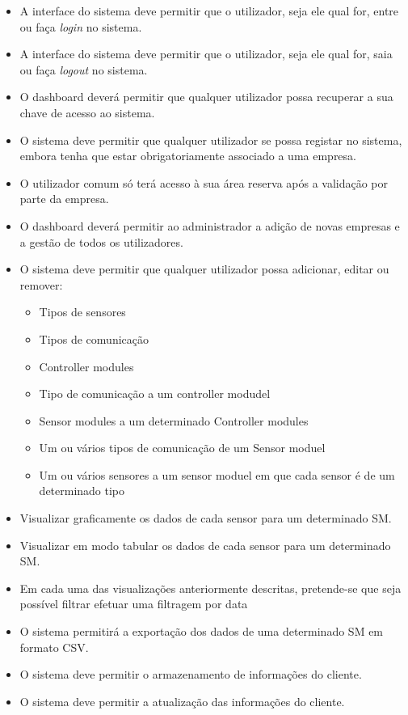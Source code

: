 \begin{itemize}
	\item A interface do sistema deve permitir que o utilizador, seja ele qual for, entre ou faça \textit{login} no sistema. 
	
	\item A interface do sistema deve permitir que o utilizador, seja ele qual for, saia ou faça \textit{logout} no sistema.
	
	\item O dashboard deverá permitir que qualquer utilizador possa recuperar a sua chave de acesso ao sistema.
	
	\item O sistema deve permitir que qualquer utilizador se possa registar no sistema, embora tenha que estar obrigatoriamente associado a uma empresa.
	
	\item O utilizador comum só terá acesso à sua área reserva após a validação por parte da empresa.   
	
	\item O dashboard deverá permitir ao administrador a adição de novas empresas e a gestão de todos os utilizadores. 
	
	\item O sistema deve permitir que qualquer utilizador possa adicionar, editar ou remover: 
	\begin{itemize}
		\item Tipos de sensores 
		\item Tipos de comunicação 
		\item Controller modules
		\item Tipo de comunicação a um controller modudel
		\item Sensor modules a um determinado Controller modules
		\item Um ou vários tipos de comunicação de um Sensor moduel
		\item Um ou vários sensores a um sensor moduel em que cada sensor é de um determinado tipo 
		
	\end{itemize}
	
	\item Visualizar graficamente os dados de cada sensor para um determinado \ac{SM}. 
	
	
	\item Visualizar em modo tabular os dados de cada sensor para um determinado \ac{SM}. 
	
	\item Em cada uma das visualizações anteriormente descritas, pretende-se que seja possível filtrar efetuar uma filtragem por data
	
	
	\item O sistema permitirá a exportação dos dados de uma determinado \ac{SM} em formato \ac{CSV}. 
	
	
	
	\item O sistema deve permitir o armazenamento de informações do cliente.
	
	\item O sistema deve permitir a atualização das informações do cliente.
\end{itemize}


